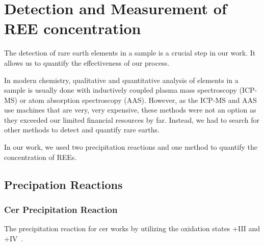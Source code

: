 \chapter{Detection and Measurement of REE concentration\authorA{}}


The detection of rare earth elements in a sample is a crucial step in our work.
It allows us to quantify the effectiveness of our process.

In modern chemistry,
qualitative and quantitative analysis of elements in a sample is usually done with inductively coupled plasma mass spectroscopy (ICP-MS) or atom absorption spectroscopy (AAS).
However, as the ICP-MS and AAS use machines that are very, very expensive,
these methods were not an option as they exceeded our limited financial resources by far.
Instead, we had to search for other methods to detect and quantify rare earths.

In our work, we used two precipitation reactions and one method to quantify the concentration of REEs.


\section{Precipation Reactions}

\subsection{Cer Precipitation Reaction}
The precipitation reaction for cer works by utilizing the oxidation states +III and +IV~\cite{cerdetection,janderblasius}.


